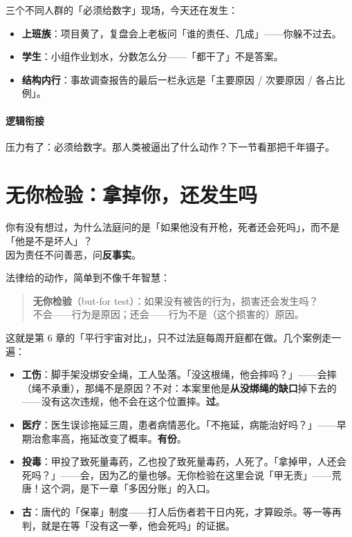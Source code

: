 \documentclass[../../main2.tex]{subfiles}
\begin{document}
三个不同人群的「必须给数字」现场，今天还在发生：

\begin{itemize}
	\item \textbf{上班族}：项目黄了，复盘会上老板问「谁的责任、几成」——你躲不过去。
	\item \textbf{学生}：小组作业划水，分数怎么分——「都干了」不是答案。
	\item \textbf{结构内行}：事故调查报告的最后一栏永远是「主要原因 / 次要原因 / 各占比例」。
\end{itemize}

\paragraph*{逻辑衔接}
	压力有了：必须给数字。那人类被逼出了什么动作？下一节看那把千年镊子。

\section{无你检验：拿掉你，还发生吗}

\begin{readingnote}
	你有没有想过，为什么法庭问的是「如果他没有开枪，死者还会死吗」，而不是「他是不是坏人」？\\
	因为责任不问善恶，问\textbf{反事实}。
\end{readingnote}

法律给的动作，简单到不像千年智慧：

\begin{quote}
	\textbf{无你检验}（but-for test）：如果没有被告的行为，损害还会发生吗？\\
	不会——行为是原因；还会——行为不是（这个损害的）原因。
\end{quote}

这就是第 6 章的「平行宇宙对比」，只不过法庭每周开庭都在做。几个案例走一遍：

\begin{itemize}
	\item \textbf{工伤}：脚手架没绑安全绳，工人坠落。「没这根绳，他会摔吗？」——会摔（绳不承重），那绳不是原因？不对：本案里他是\textbf{从没绑绳的缺口}掉下去的——没有这次违规，他不会在这个位置摔。\textbf{过}。
	\item \textbf{医疗}：医生误诊拖延三周，患者病情恶化。「不拖延，病能治好吗？」——早期治愈率高，拖延改变了概率。\textbf{有份}。
	\item \textbf{投毒}：甲投了致死量毒药，乙也投了致死量毒药，人死了。「拿掉甲，人还会死吗？」——会，因为乙的量也够。无你检验在这里会说「甲无责」——荒唐！这个洞，是下一章「多因分账」的入口。
	\item \textbf{古}：唐代的「保辜」制度——打人后伤者若干日内死，才算殴杀。等一等再判，就是在等「没有这一拳，他会死吗」的证据。
\end{itemize}
\end{document}
